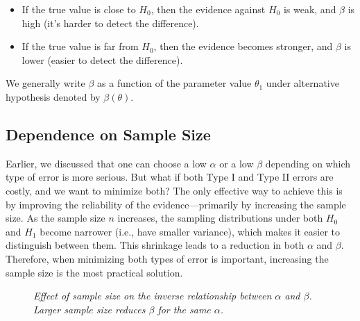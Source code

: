 \documentclass[twoside]{book}
\begin{document}
\begin{itemize}
	\item If the true value is close to $H_0$, then the evidence against $H_0$ is weak, and $\beta$ is high (it’s harder to detect the difference).

	\item If the true value is far from $H_0$, then the evidence becomes stronger, and $\beta$ is lower (easier to detect the difference).
\end{itemize}
We generally write $\beta$ as a function of the parameter value $\theta_1$ under alternative hypothesis denoted by $\beta(\theta)$.

\subsection{Dependence on Sample Size}
Earlier, we discussed that one can choose a low $\alpha$ or a low $\beta$ depending on which type of error is more serious. But what if both Type I and Type II errors are costly, and we want to minimize both? The only effective way to achieve this is by improving the reliability of the evidence—primarily by increasing the sample size. As the sample size $n$ increases, the sampling distributions under both $H_0$ and $H_1$ become narrower (i.e., have smaller variance), which makes it easier to distinguish between them. This shrinkage leads to a reduction in both $\alpha$ and $\beta$. Therefore, when minimizing both types of error is important, increasing the sample size is the most practical solution.


\begin{figure}[H]
	\centering
	\caption{\textit{Effect of sample size on the inverse relationship between \(\alpha\) and \(\beta\). Larger sample size reduces \(\beta\) for the same \(\alpha\).}}
	\label{fig:alpha_beta_sample_size}
\end{figure}
\end{document}
